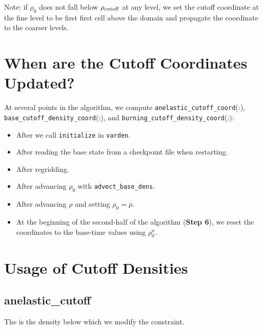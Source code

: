 Note: if $\rho_0$ does not fall below $\rho_{\rm cutoff}$ at any level, we set the cutoff 
coordinate at the fine level to be first first cell above the domain and propagate the 
coordinate to the coarser levels.

\section{When are the Cutoff Coordinates Updated?}

At several points in the algorithm, we compute {\tt anelastic\_cutoff\_coord}(:), 
{\tt base\_cutoff\_density\_coord}(:), and {\tt burning\_cutoff\_density\_coord}(:):

\begin{itemize}

\item After we call {\tt initialize} in {\tt varden}.

\item After reading the base state from a checkpoint file when restarting.

\item After regridding.

\item After advancing $\rho_0$ with {\tt advect\_base\_dens}.

\item After advancing $\rho$ and setting $\rho_0 = \overline{\rho}$.

\item At the beginning of the second-half of the algorithm ({\bf Step 6}), we reset
  the coordinates to the base-time values using $\rho_0^n$.

\end{itemize}

\section{Usage of Cutoff Densities}

\subsection{anelastic\_cutoff}\label{Sec:Anelastic Cutoff}

The  is the density below which we modify the constraint.


